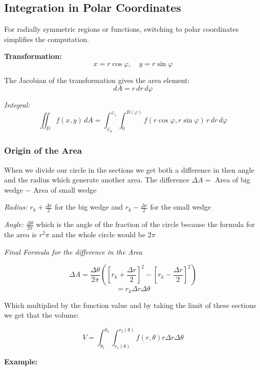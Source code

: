 \subsection{Integration in Polar Coordinates}

For radially symmetric regions or functions, switching to polar coordinates simplifies the computation.
\vspace{\baselineskip}

\textbf{Transformation:}
\[
x = r \cos \varphi, \quad y = r \sin \varphi
\]

The Jacobian of the transformation gives the area element:
\[
dA = r\, dr\, d\varphi
\]


\emph{Integral:}
\[
\iint_D f(x, y)\, dA = \int_{\varphi_0}^{\varphi_1} \int_{0}^{R(\varphi)} f(r \cos \varphi, r \sin \varphi)\, r\, dr\, d\varphi
\]

\subsubsection{Origin of the Area}
When we divide our circle in the sections we get both a difference in then angle and the radius which generate another area.
The difference \(\Delta A =\) Area of big wedge \(-\) Area of small wedge
\vspace{\baselineskip}

\emph{Radius: }\(r_k + \frac{\Delta r}{2}\) for the big wedge and \(r_k - \frac{\Delta r}{2}\) for the small wedge
\vspace{\baselineskip}

\emph{Angle: }\(\frac{\Delta \theta}{2 \pi}\) which is the angle of the fraction of the circle because the formula for the area is \(r^2 \pi\)
and the whole circle would be \(2\pi\)
\vspace{\baselineskip}

\emph{Final Formula for the difference in the Area}

\[\Delta A = \frac{\Delta \theta}{2 \pi} \left ( {\left[r_k + \frac{\Delta r}{2}\right]}^2 - {\left[r_k - \frac{\Delta r}{2}\right]}^2\right)\] 
\[ = r_k \Delta r \Delta \theta\]

Which multiplied by the function value and by taking the limit of these sections we get that the volume:

\[
V = \int_{\theta_1}^{\theta_2} \int_{r_1 (\theta)}^{r_2 (\theta)} f(r, \theta) r \Delta r \Delta \theta
\]

\textbf{Example:}
\vspace{\baselineskip}

